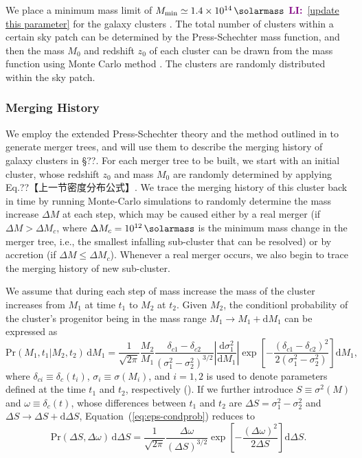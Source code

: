 \documentclass[modern]{aastex61}
\newcommand{\R}[1]{\mathrm{#1}}
\newcommand{\D}[1]{\R{d} #1}
\newcommand{\diff}[2]{\frac{\D{#1}}{\D{#2}}}
\newcommand{\LI}[1]{\textcolor{purple}{\textbf{LI:}}~\uline{#1}}
\begin{document}
We place a minimum mass limit of $M_{\R{min}} \simeq \SI{1.4e14}{\solarmass}$
\LI{[update this parameter]} for the galaxy clusters \citep{zandanel2014}.
The total number of clusters within a certain sky patch can be
determined by the Press-Schechter mass function, and then the mass
$M_0$ and redshift $z_0$ of each cluster can be drawn from the mass
function using Monte Carlo method \citep{wang2010}.
The clusters are randomly distributed within the sky patch.


\subsubsection{Merging History}
\label{sec:merging-history}

We employ the extended Press-Schechter theory and the method outlined in
\citet{lacey1993} to generate merger trees,
and will use them to describe the merging history of galaxy clusters in
\S??. For each merger tree to be built,
we start with an initial cluster, whose redshift $z_{0}$ and mass $M_{0}$
are randomly determined by applying Eq.??【上一节密度分布公式】.
We trace the merging history of this cluster back in time by running
Monte-Carlo simulations to randomly determine the mass increase
$\Delta M$ at each step, which may be caused either by a real merger (if
$\Delta M > \Delta M_c$, where $\Delta M_c = \SI{e12}{\solarmass}$
is the minimum mass change in the merger tree, i.e., the smallest infalling
sub-cluster that can be resolved)
or by accretion  (if $\Delta M \leq \Delta M_c$). Whenever a real merger
occurs, we also begin to trace the merging history
of new sub-cluster.

We assume that during each step of mass increase the mass of the cluster
increases from $M_{1}$ at time $t_{1}$ to $M_{2}$ at $t_{2}$.
Given $M_{2}$, the conditionl probability of the cluster's progenitor being
in the mass range $M_{1} \to M_{1} + \D{M_{1}}$
can be expressed as
\begin{equation}
  \R{Pr}(M_1, t_1 | M_2, t_2) \,\D{M_1} = \frac{1}{\sqrt{2\pi}}
\frac{M_2}{M_1}
  \frac{\delta_{c1} - \delta_{c2}}{(\sigma_1^2 - \sigma_2^2)^{3/2}}
  \left| \diff{\sigma_1^2}{M_1} \right|
  \exp \!\left[ -\frac{(\delta_{c1} - \delta_{c2})^2}
    {2(\sigma_1^2 - \sigma_2^2)} \right] \D{M_1},
\end{equation}
where
$\delta_{ci} \equiv \delta_c(t_i)$, $\sigma_i \equiv \sigma(M_i)$, and $i =
1, 2$ is used to denote parameters defined at the time $t_{1}$ and $t_{2}$,
respectively (\citep{lacey1993,randall2002}).
If we further introduce $S \equiv \sigma^2(M)$ and $\omega \equiv
\delta_c(t)$, whose differences between $t_{1}$ and $t_{2}$
are $\Delta S = \sigma_1^2 - \sigma_2^2$ and $\Delta S \to \Delta S +
\D{\Delta S}$, Equation~(\ref{eq:eps-condprob}) reduces to
\begin{equation}
  \R{Pr}(\Delta S, \Delta \omega) \,\D{\Delta S} = \frac{1}{\sqrt{2\pi}}
  \frac{\Delta\omega}{(\Delta S)^{3/2}}
  \exp \!\left[ -\frac{(\Delta\omega)^2}{2 \Delta S} \right] \D{\Delta S}.
\end{equation}
\end{document}
